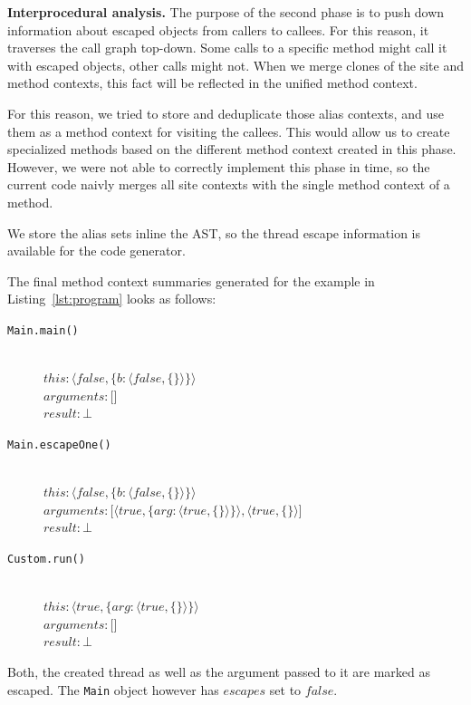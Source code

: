 \documentclass[letterpaper]{article}
\newcommand{\mypar}[1]{{\bf #1.}}
\begin{document}
\mypar{Interprocedural analysis}
The purpose of the second phase is to push down information about escaped objects from callers to callees.
For this reason, it traverses the call graph top-down. Some calls to a specific method might call it
with escaped objects, other calls might not. When we merge clones of the site and method contexts,
this fact will be reflected in the unified method context. 

For this reason, we tried to store and deduplicate those alias contexts, and use them as a method context
for visiting the callees. This would allow us to create specialized methods based on the different
method context created in this phase. However, we were not able to correctly implement this phase in time,
so the current code naivly merges all site contexts with the single method context of a method.

We store the alias sets inline the AST, so the thread escape information is available for the code
generator.

The final method context summaries generated for the example in Listing~\ref{lst:program} looks as follows:

{ \footnotesize

\begin{description}
\item[\texttt{Main.main()}] \hfill \\
    $ this: \langle false, \{ b:\langle false, \{ \} \rangle\} \rangle $ \\ 
    $ arguments: \lbrack \rbrack $ \\
    $ result: \bot  $ 
\item[\texttt{Main.escapeOne()}] \hfill \\
    $ this: \langle false, \{ b:\langle false, \{ \} \rangle\} \rangle $ \\
    $ arguments: \lbrack \langle true, \{ arg:\langle true, \{ \} \rangle\} \rangle, \langle true, \{ \} \rangle \rbrack $ \\
    $ result: \bot $
\item[\texttt{Custom.run()}] \hfill \\
 $ this: \langle true, \{ arg:\langle true, \{ \} \rangle\} \rangle $ \\
 $ arguments: \lbrack \rbrack $ \\ 
 $ result: \bot $
\end{description}
}

Both, the created thread as well as the argument passed to it are marked as escaped. The \texttt{Main} object however
has $escapes$ set to $false$.
\end{document}
